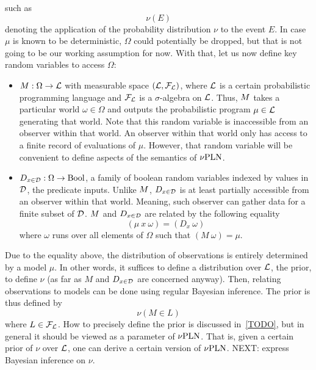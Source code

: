 \documentclass[]{article}
\begin{document}
such as
$$\nu(E)$$ denoting the application of the probability distribution
$\nu$ to the event $E$.  In case $\mu$ is known to be deterministic,
$\Omega$ could potentially be dropped, but that is not going to be our
working assumption for now.  With that, let us now define key random
variables to access $\Omega$:
\begin{itemize}
\item $M : \Omega \to \mathcal{L}$ with measurable space
  $(\mathcal{L}, \mathcal{F}_{\mathcal{L}})$, where $\mathcal{L}$ is a certain
  probabilistic programming language and $\mathcal{F}_{\mathcal{L}}$ is a
  $\sigma$-algebra on $\mathcal{L}$.  Thus, $M$ takes a particular
  world $\omega \in \Omega$ and outputs the probabilistic program $\mu
  \in \mathcal{L}$ generating that world.  Note that this random
  variable is inaccessible from an observer within that world.  An
  observer within that world only has access to a finite record of
  evaluations of $\mu$.  However, that random variable will be
  convenient to define aspects of the semantics of $\nu\textup{PLN}$.
\item $D_{x\in\mathcal{D}} : \Omega \to \textup{Bool}$, a family of boolean random variables
  indexed by values in $\mathcal{D}$, the predicate inputs.  Unlike
  $M$, $D_{x\in\mathcal{D}}$ is at least partially accessible from an observer
  within that world.  Meaning, such observer can gather data for a
  finite subset of $\mathcal{D}$.  $M$ and $D_{x\in\mathcal{D}}$ are related by the
  following equality
  $$(\mu\ x\ \omega) = (D_x\ \omega)$$ where $\omega$ runs over all
  elements of $\Omega$ such that $(M\ \omega) = \mu$.
\end{itemize}
Due to the equality above, the distribution of observations is
entirely determined by a model $\mu$.  In other words, it suffices to
define a distribution over $\mathcal{L}$, the prior, to define $\nu$ (as
far as $M$ and $D_{x\in\mathcal{D}}$ are concerned anyway).  Then, relating
observations to models can be done using regular Bayesian inference.
The prior is thus defined by
$$\nu(M \in L)$$ where $L \in \mathcal{F}_{\mathcal{L}}$.  How to precisely
define the prior is discussed in~\ref{TODO}, but in general it should
be viewed as a parameter of $\nu\textup{PLN}$.  That is, given a certain prior
of $\nu$ over $\mathcal{L}$, one can derive a certain version of
$\nu\textup{PLN}$.  NEXT: express Bayesian inference on $\nu$.
\end{document}
